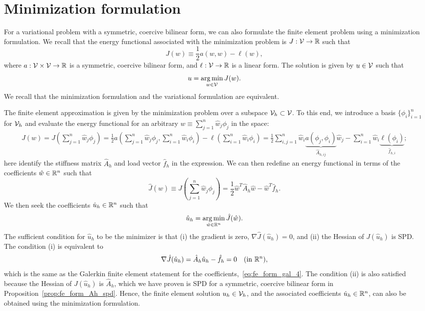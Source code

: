 \section{Minimization formulation}
For a variational problem with a symmetric, coercive bilinear form, we can also formulate the finite element problem using a minimization formulation.  We recall that the energy functional associated with the minimization problem is $J: \mathcal{V} \to \mathbb{R}$ such that
\begin{equation*}
  J(w) \equiv \frac{1}{2} a(w,w) - \ell(w),
\end{equation*}
where $a: \mathcal{V} \times \mathcal{V} \to \mathbb{R}$ is a symmetric, coercive bilinear form, and $\ell: \mathcal{V} \to \mathbb{R}$ is a linear form.  The solution is given by $u \in \mathcal{V}$ such that
\begin{equation*}
  u = \operatorname*{arg\,min}_{w \in \mathcal{V}} J(w).
\end{equation*}
We recall that the minimization formulation and the variational formulation are equivalent.

The finite element approximation is given by the minimization problem over a subspace $\mathcal{V}_h \subset \mathcal{V}$. To this end, we introduce a basis $\{\phi_i\}_{i=1}^n$ for $\mathcal{V}_h$ and evaluate the energy functional for an arbitrary $w \equiv \sum_{j=1}^n \hat w_j \phi_j$ in the space:
\begin{align*}
  J(w) =  J(\sum_{j=1}^n \hat w_j \phi_j)
  = \frac{1}{2} a (\sum_{j=1}^n \hat w_j \phi_j, \sum_{i=1}^n \hat w_i \phi_i) - \ell(\sum_{i=1}^n \hat w_i \phi_i)
  = \frac{1}{2} \sum_{i,j=1}^n \hat w_i \underbrace{ a(\phi_j,\phi_i) }_{\hat A_{h,ij}} \hat w_j - \sum_{i=1}^n \hat w_i \underbrace{ \ell(\phi_i) }_{\hat f_{h,i}};
\end{align*}
here identify the stiffness matrix $\hat A_h$ and load vector $\hat f_h$ in the expression. We can then redefine an energy functional in terms of the coefficients $\hat w \in \mathbb{R}^n$ such that 
\begin{equation*}
  \hat J(\hat w) \equiv J(\sum_{j=1}^n \hat w_j \phi_j)
  = \frac{1}{2} \hat w^T \hat A_h \hat w - \hat w^T \hat f_h.
\end{equation*}
We then seek the coefficients $\hat u_h \in \mathbb{R}^n$ such that
\begin{equation*}
  \hat u_h = \operatorname*{arg\,min}_{\hat w \in \mathbb{R}^n} \hat J(\hat w).
\end{equation*}
The sufficient condition for $\hat u_h$ to be the minimizer is that (i) the gradient is zero, $\nabla \hat J(\hat u_h) = 0$, and (ii) the Hessian of $J(\hat u_h)$ is SPD.  The condition (i) is equivalent to
\begin{equation*}
  \nabla \hat J(\hat u_h) = \hat A_h \hat u_h - \hat f_h = 0 \quad (\text{in } \mathbb{R}^n),
\end{equation*}
which is the same as the Galerkin finite element statement for the coefficients,~\ref{eq:fe_form_gal_4}.  The condition (ii) is also satisfied because the Hessian of $J(\hat u_h)$ is $\hat A_h$, which we have proven is SPD for a symmetric, coercive bilinear form in Proposition~\eqref{prop:fe_form_Ah_spd}. Hence, the finite element solution $u_h \in \mathcal{V}_h$, and the associated coefficients $\hat u_h \in \mathbb{R}^n$, can also be obtained using the minimization formulation.

